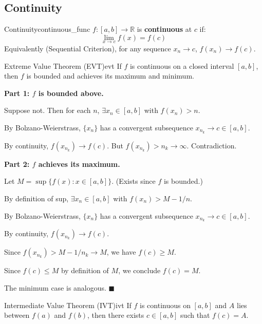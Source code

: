 \documentclass[11pt, letterpaper, openany]{book}
\renewenvironment{proof}[1][\proofname]{%
  \tcolorbox[blanker, breakable, left=1em,
    before skip=1em, after skip=1em,
    borderline west={2pt}{0pt}{MagicTeal!50},
    colback=MagicCream,
    before upper={\textcolor{MagicTeal}{\sffamily\bfseries #1.}\space}
  ]%
}{%
  \hfill\textcolor{MagicTeal}{\ensuremath{\blacksquare}}\endtcolorbox%
}
\begin{document}
\subsection{Continuity}
\begin{defn}{Continuity}{continuous_func}
$f: [a,b] \to \mathbb{R}$ is \textbf{continuous} at $c$ if:
\[ \lim_{x \to c} f(x) = f(c) \]
Equivalently (Sequential Criterion), for any sequence $x_n \to c$, $f(x_n) \to f(c)$.
\end{defn}

\begin{thm}{Extreme Value Theorem (EVT)}{evt}
If $f$ is continuous on a closed interval $[a,b]$, then $f$ is bounded and achieves its maximum and minimum.
\end{thm}

\begin{proof}
\textbf{Part 1: $f$ is bounded above.}

Suppose not. Then for each $n$, $\exists x_n \in [a,b]$ with $f(x_n) > n$.

By Bolzano-Weierstrass, $\{x_n\}$ has a convergent subsequence $x_{n_k} \to c \in [a,b]$.

By continuity, $f(x_{n_k}) \to f(c)$. But $f(x_{n_k}) > n_k \to \infty$. Contradiction.

\textbf{Part 2: $f$ achieves its maximum.}

Let $M = \sup\{f(x) : x \in [a,b]\}$. (Exists since $f$ is bounded.)

By definition of sup, $\exists x_n \in [a,b]$ with $f(x_n) > M - 1/n$.

By Bolzano-Weierstrass, $\{x_n\}$ has a convergent subsequence $x_{n_k} \to c \in [a,b]$.

By continuity, $f(x_{n_k}) \to f(c)$.

Since $f(x_{n_k}) > M - 1/n_k \to M$, we have $f(c) \geq M$.

Since $f(c) \leq M$ by definition of $M$, we conclude $f(c) = M$.

The minimum case is analogous.
\end{proof}

\begin{thm}{Intermediate Value Theorem (IVT)}{ivt}
If $f$ is continuous on $[a,b]$ and $A$ lies between $f(a)$ and $f(b)$, then there exists $c \in [a,b]$ such that $f(c) = A$.
\end{thm}
\end{document}
